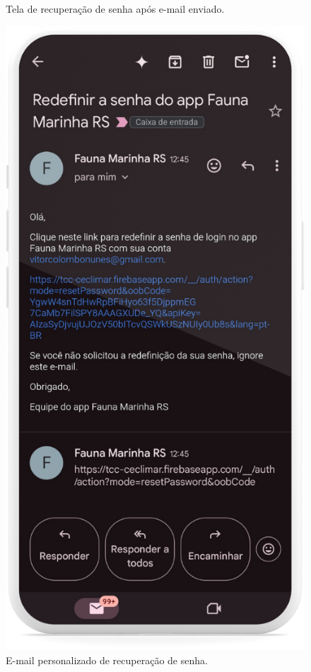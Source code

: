\begin{figure}[H]
\begin{minipage}[t]{0.48\textwidth}
        \caption{Tela de recuperação de senha após e-mail enviado.}
        \label{fig:email-esqueci-senha-sucesso}
    \end{minipage}
    \hfill
    \begin{minipage}[t]{0.48\textwidth}
        \centering
        \includegraphics[height=0.72\textheight]{imagens/sistema/device_frame/emailRecSenha.png}
        \caption{E-mail personalizado de recuperação de senha.}
        \label{fig:email-esqueci-senha}
    \end{minipage}
\end{figure}


